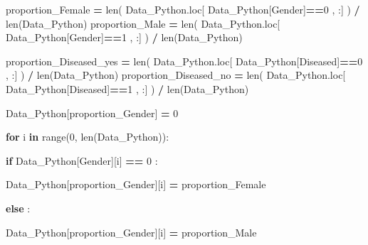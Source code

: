 \documentclass[
  11pt,
  a4paper,
]{article}
\newenvironment{Shaded}{\begin{snugshade}}{\end{snugshade}}
\newcommand{\BuiltInTok}[1]{#1}
\newcommand{\ControlFlowTok}[1]{\textcolor[rgb]{0.13,0.29,0.53}{\textbf{#1}}}
\newcommand{\DecValTok}[1]{\textcolor[rgb]{0.00,0.00,0.81}{#1}}
\newcommand{\KeywordTok}[1]{\textcolor[rgb]{0.13,0.29,0.53}{\textbf{#1}}}
\newcommand{\NormalTok}[1]{#1}
\newcommand{\OperatorTok}[1]{\textcolor[rgb]{0.81,0.36,0.00}{\textbf{#1}}}
\newcommand{\StringTok}[1]{\textcolor[rgb]{0.31,0.60,0.02}{#1}}
\begin{document}
\begin{Shaded}
\begin{Highlighting}[]
\NormalTok{proportion\_Female }\OperatorTok{=} \BuiltInTok{len}\NormalTok{( Data\_Python.loc[ Data\_Python[}\StringTok{\textquotesingle{}Gender\textquotesingle{}}\NormalTok{]}\OperatorTok{==}\DecValTok{0}\NormalTok{ , :] ) }\OperatorTok{/} \BuiltInTok{len}\NormalTok{(Data\_Python)}
\NormalTok{proportion\_Male }\OperatorTok{=} \BuiltInTok{len}\NormalTok{( Data\_Python.loc[ Data\_Python[}\StringTok{\textquotesingle{}Gender\textquotesingle{}}\NormalTok{]}\OperatorTok{==}\DecValTok{1}\NormalTok{ , :] ) }\OperatorTok{/} \BuiltInTok{len}\NormalTok{(Data\_Python)}

\NormalTok{proportion\_Diseased\_yes }\OperatorTok{=} \BuiltInTok{len}\NormalTok{( Data\_Python.loc[ Data\_Python[}\StringTok{\textquotesingle{}Diseased\textquotesingle{}}\NormalTok{]}\OperatorTok{==}\DecValTok{0}\NormalTok{ , :] ) }\OperatorTok{/} \BuiltInTok{len}\NormalTok{(Data\_Python)}
\NormalTok{proportion\_Diseased\_no }\OperatorTok{=} \BuiltInTok{len}\NormalTok{( Data\_Python.loc[ Data\_Python[}\StringTok{\textquotesingle{}Diseased\textquotesingle{}}\NormalTok{]}\OperatorTok{==}\DecValTok{1}\NormalTok{ , :] ) }\OperatorTok{/} \BuiltInTok{len}\NormalTok{(Data\_Python)}
\end{Highlighting}
\end{Shaded}

\begin{Shaded}
\begin{Highlighting}[]
\NormalTok{Data\_Python[}\StringTok{\textquotesingle{}proportion\_Gender\textquotesingle{}}\NormalTok{] }\OperatorTok{=} \DecValTok{0}


\ControlFlowTok{for}\NormalTok{ i }\KeywordTok{in} \BuiltInTok{range}\NormalTok{(}\DecValTok{0}\NormalTok{, }\BuiltInTok{len}\NormalTok{(Data\_Python)):}

    \ControlFlowTok{if}\NormalTok{ Data\_Python[}\StringTok{\textquotesingle{}Gender\textquotesingle{}}\NormalTok{][i] }\OperatorTok{==} \DecValTok{0}\NormalTok{ :}

\NormalTok{        Data\_Python[}\StringTok{\textquotesingle{}proportion\_Gender\textquotesingle{}}\NormalTok{][i] }\OperatorTok{=}\NormalTok{ proportion\_Female}

    \ControlFlowTok{else}\NormalTok{ :}

\NormalTok{        Data\_Python[}\StringTok{\textquotesingle{}proportion\_Gender\textquotesingle{}}\NormalTok{][i] }\OperatorTok{=}\NormalTok{ proportion\_Male}
\end{Highlighting}
\end{Shaded}
\end{document}
